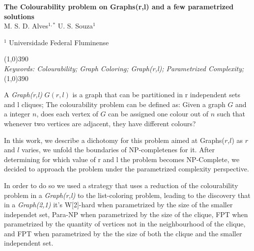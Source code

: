 \documentclass[12pt]{article}
\begin{document}
\pagestyle{empty}

\begin{center}
\Large

{\bf The {Colourability} problem on Graphs(r,l) and a few parametrized solutions }\\[0.2in]

\large
%
%
%
M. S. D. Alves$^{1,*}$\hspace{.2cm}
U. S. Souza$^1$\hspace{.2cm}

%
$^1$ Universidade Federal Fluminense

\end{center}
\normalsize
\vspace{-2.0ex}

%
\noindent\line(1,0){390}\\
%
{\it Keywords: Colourability; Graph Coloring; Graph(r,l); Parametrized Complexity;}\\%
%
\line(1,0){390}\\
\vspace{-2.0ex}
\sloppy

A \emph{Graph(r,l)} $G(r,l)$ is a graph that can be partitioned in r independent sets and l cliques;
The colourability problem can be defined as: Given a graph $G$ and a integer $n$, does each vertex of $G$ can be assigned one colour out of $n$ such that whenever two vertices are adjacent, they have different colours?

 In this work, we describe a dichotomy for this problem aimed at Graphs($r$,$l$) as $r$ and $l$ varies, we unfold the boundaries of NP-completenes for it.
 After determining for which value of r and l the problem becomes NP-Complete, we decided to approach the problem under the parametrized complexity perspective. 
 
 In order to do so we used a strategy that uses a reduction of the colourability problem in a \emph{Graph(r,l)} to the list-coloring problem, leading to the discovery that in a \emph{Graph(2,1)} it's W[2]-hard when parametrized by the size of the smaller independet set, Para-NP when parametrized by the size of the clique, FPT when parametrized by the quantity of vertices not in the neighbourhood of the clique, and FPT when parametrized by the the size of both the clique and the smaller independent set.
 
\vspace{-2ex}
\end{document}
